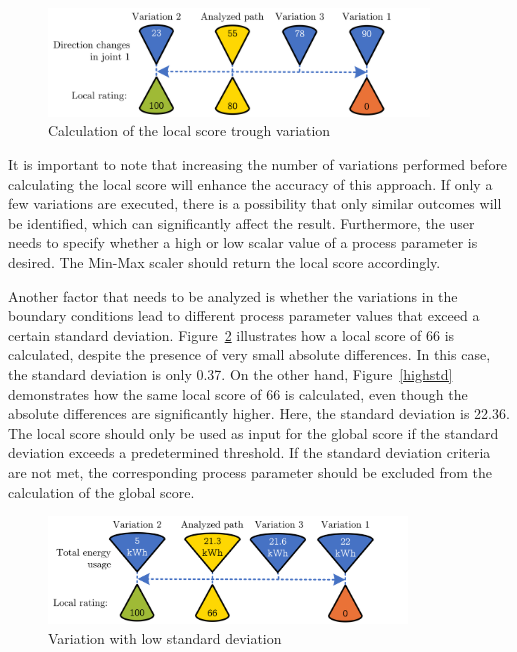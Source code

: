 \begin{figure}[H]
	\centerline{\includegraphics[width=0.9\textwidth]{figures/localscore.png}}
	\caption{Calculation of the local score trough variation}
	\label{Localscore}
\end{figure}

It is important to note that increasing the number of variations performed before calculating the local score will enhance the accuracy of this approach. If only a few variations are executed, there is a possibility that only similar outcomes will be identified, which can significantly affect the result. Furthermore, the user needs to specify whether a high or low scalar value of a process parameter is desired. The Min-Max scaler should return the local score accordingly. 

Another factor that needs to be analyzed is whether the variations in the boundary conditions lead to different process parameter values that exceed a certain standard deviation. Figure~\ref{lowstd} illustrates how a local score of 66 is calculated, despite the presence of very small absolute differences. In this case, the standard deviation is only 0.37. On the other hand, Figure~\ref{highstd} demonstrates how the same local score of 66 is calculated, even though the absolute differences are significantly higher. Here, the standard deviation is 22.36. The local score should only be used as input for the global score if the standard deviation exceeds a predetermined threshold. If the standard deviation criteria are not met, the corresponding process parameter should be excluded from the calculation of the global score.

\begin{figure}[H]
	\centerline{\includegraphics[width=0.85\textwidth]{figures/lowstd.png}}
	\caption{Variation with low standard deviation}
	\label{lowstd}
\end{figure}

